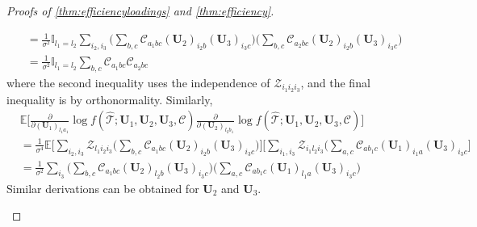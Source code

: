 \documentclass[10pt]{article}
\newcommand{\0}{{\mathbf{0}}}
\newcommand{\1}{{\mathbf{1}}}
\newcommand{\E}{{\mathbf{E}}}
\newcommand{\U}{{\mathbf{U}}}
\renewcommand{\E}{\mathbb{E}}
\newcommand{\del}{\partial}
\renewcommand{\hat}{\widehat}
\renewcommand{\hat}{\widehat}
\begin{document}
\begin{proof}[Proofs of \cref{thm:efficiencyloadings} and \cref{thm:efficiency}]
\begin{itemize}
\begin{align}
&= \frac{1}{\sigma^2} \mathbb{I}_{l_1 = l_2}\sum_{i_2, i_3} \bigg( \sum_{b,c} \mathcal{C}_{a_1 bc} (\U_2)_{i_2 b} (\U_3 )_{i_3 c}  \bigg) \bigg(  \sum_{b,c} \mathcal{C}_{a_2 bc} (\U_2)_{i_2 b} (\U_3 )_{i_3 c} \bigg) \nonumber \\
&= \frac{1}{\sigma^2} \mathbb{I}_{l_1 = l_2}\sum_{b,c} \mathcal{C}_{a_1 bc} \mathcal{C}_{a_2 bc}\label{grammatrixidentity}
\end{align}
where the second inequality uses the independence of $\mathcal{Z}_{i_1i_2i_3}$, and the final inequality is by orthonormality.  Similarly,
\begin{align}
&\E \Bigg[  \frac{\del }{\del (\U_1)_{l_1 a_1}}\log f( \mathcal{\hat T}; \U_1, \U_2, \U_3, \mathcal{C} ) \frac{\del }{\del (\U_2)_{l_2 b_1}}\log f( \mathcal{\hat T}; \U_1, \U_2, \U_3, \mathcal{C} ) \Bigg] \nonumber \\
&=  \frac{1}{\sigma^4} \E \Bigg[ \sum_{i_2, i_3} \mathcal{Z}_{l_1 i_2 i_3}   \bigg( \sum_{b,c} \mathcal{C}_{a_1 bc} (\U_2)_{i_2 b} (\U_3 )_{i_3 c}  \bigg) \Bigg]  \Bigg[  \sum_{i_1, i_3} \mathcal{Z}_{i_1 l_2 i_3}   \bigg( \sum_{a,c} \mathcal{C}_{a b_1 c} (\U_1)_{i_1 a} (\U_3 )_{i_3 c} \Bigg] \nonumber\\
&= \frac{1}{\sigma^2} \sum_{i_3} \bigg(\sum_{b,c} \mathcal{C}_{a_1 bc} (\U_2)_{l_2 b} (\U_3)_{i_3 c} \bigg) \bigg( \sum_{a,c} \mathcal{C}_{a b_1 c} (\U_1)_{l_1 a} (\U_3 )_{i_3 c} \bigg) \label{eq:Hidentity}
\end{align}
Similar derivations can be obtained for $\U_2$ and $\U_3$. 


\end{itemize}
\end{proof}
\end{document}
